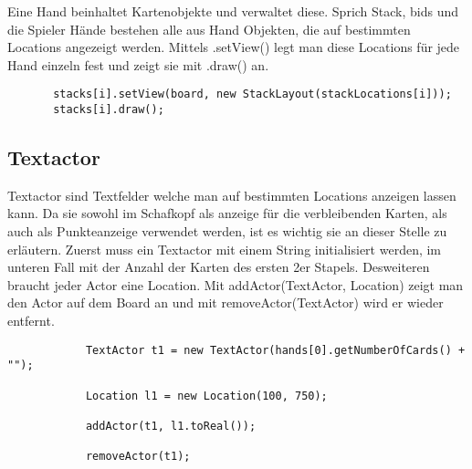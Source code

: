	
		
Eine Hand beinhaltet Kartenobjekte und verwaltet diese. Sprich Stack, bids und die Spieler Hände bestehen alle aus Hand Objekten, die auf bestimmten Locations angezeigt werden.
Mittels .setView() legt man diese Locations für jede Hand einzeln fest und zeigt sie mit .draw() an.	      
	      \begin{lstlisting}   
	   stacks[i].setView(board, new StackLayout(stackLocations[i]));
	   stacks[i].draw();
	\end{lstlisting}

\subsection{Textactor}
Textactor sind Textfelder welche man auf bestimmten Locations anzeigen lassen kann.
Da sie sowohl im Schafkopf als anzeige für die verbleibenden Karten, als auch als Punkteanzeige verwendet werden, ist es wichtig sie an dieser Stelle zu erläutern.
Zuerst muss ein Textactor mit einem String initialisiert werden, im unteren Fall mit der Anzahl der Karten des ersten 2er Stapels. Desweiteren braucht jeder Actor eine Location.
Mit addActor(TextActor, Location) zeigt man den Actor auf dem Board an und mit removeActor(TextActor) wird er wieder entfernt.


\begin{lstlisting}
	        TextActor t1 = new TextActor(hands[0].getNumberOfCards() + "");
           
            Location l1 = new Location(100, 750);

			addActor(t1, l1.toReal());

			removeActor(t1);
\end{lstlisting}	
	
	
	
	
	
	
